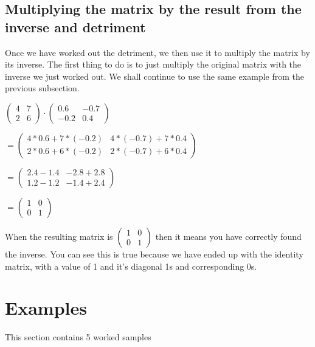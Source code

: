 \documentclass[options]{article}
\begin{document}
\subsection{Multiplying the matrix by the result from the inverse and detriment}
Once we have worked out the detriment, we then use it to multiply the matrix by its inverse. The first thing to do is to just multiply the original matrix with the inverse we just worked out.
We shall continue to use the same example from the previous subsection. 
\begin{center}
    \(
        \begin{pmatrix}
            4 & 7\\
            2 & 6
        \end{pmatrix}
        \cdot
        \begin{pmatrix}
            0.6 & -0.7\\
            -0.2 & 0.4
        \end{pmatrix}
    \)

    \(
        =
        \begin{pmatrix}
            4 * 0.6 + 7 * (-0.2) & 4 * (-0.7) + 7 * 0.4\\
            2 * 0.6 + 6 * (-0.2) & 2 * (-0.7) + 6 * 0.4
        \end{pmatrix}
    \)

    \(
        = 
        \begin{pmatrix}
            2.4 - 1.4 & -2.8 + 2.8\\
            1.2 - 1.2 & -1.4 + 2.4
        \end{pmatrix}
    \)

    \(
        =
        \begin{pmatrix}
            1 & 0\\
            0 & 1
        \end{pmatrix}
    \)
\end{center}
When the resulting matrix is \( \begin{pmatrix} 1 & 0\\0 & 1 \end{pmatrix} \) then it means you have correctly found the inverse.
You can see this is true because we have ended up with the identity matrix, with a value of 1 and it's diagonal 1s and corresponding 0s.
\section{Examples}
This section contains 5 worked samples 
\end{document}
